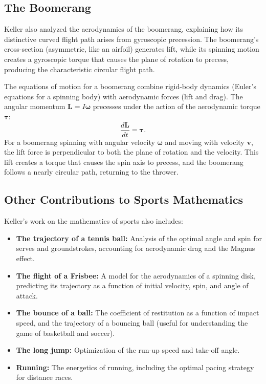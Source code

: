 \subsection{The Boomerang}

Keller also analyzed the aerodynamics of the boomerang, explaining how its distinctive curved flight path arises from gyroscopic precession. The boomerang's cross-section (asymmetric, like an airfoil) generates lift, while its spinning motion creates a gyroscopic torque that causes the plane of rotation to precess, producing the characteristic circular flight path.

The equations of motion for a boomerang combine rigid-body dynamics (Euler's equations for a spinning body) with aerodynamic forces (lift and drag). The angular momentum \(\mathbf{L} = I \boldsymbol{\omega}\) precesses under the action of the aerodynamic torque \(\boldsymbol{\tau}\):
\[
\frac{d\mathbf{L}}{dt} = \boldsymbol{\tau}.
\]
For a boomerang spinning with angular velocity \(\boldsymbol{\omega}\) and moving with velocity \(\mathbf{v}\), the lift force is perpendicular to both the plane of rotation and the velocity. This lift creates a torque that causes the spin axis to precess, and the boomerang follows a nearly circular path, returning to the thrower.

\subsection{Other Contributions to Sports Mathematics}

Keller's work on the mathematics of sports also includes:

\begin{itemize}
  \item \textbf{The trajectory of a tennis ball:} Analysis of the optimal angle and spin for serves and groundstrokes, accounting for aerodynamic drag and the Magnus effect.
  \item \textbf{The flight of a Frisbee:} A model for the aerodynamics of a spinning disk, predicting its trajectory as a function of initial velocity, spin, and angle of attack.
  \item \textbf{The bounce of a ball:} The coefficient of restitution as a function of impact speed, and the trajectory of a bouncing ball (useful for understanding the game of basketball and soccer).
  \item \textbf{The long jump:} Optimization of the run-up speed and take-off angle.
  \item \textbf{Running:} The energetics of running, including the optimal pacing strategy for distance races.
\end{itemize}

